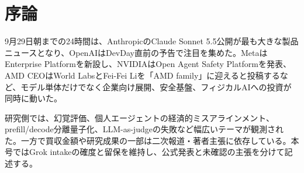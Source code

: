 \section*{序論}
9月29日朝までの24時間は、AnthropicのClaude Sonnet 5.5公開が最も大きな製品ニュースとなり、OpenAIはDevDay直前の予告で注目を集めた。MetaはEnterprise Platformを新設し、NVIDIAはOpen Agent Safety Platformを発表、AMD CEOはWorld LabsとFei-Fei Liを「AMD family」に迎えると投稿するなど、モデル単体だけでなく企業向け展開、安全基盤、フィジカルAIへの投資が同時に動いた。

研究側では、幻覚評価、個人エージェントの経済的ミスアラインメント、prefill/decode分離量子化、LLM-as-judgeの失敗など幅広いテーマが観測された。一方で買収金額や研究成果の一部は二次報道・著者主張に依存している。本号ではGrok intakeの確度と留保を維持し、公式発表と未確認の主張を分けて記述する。
